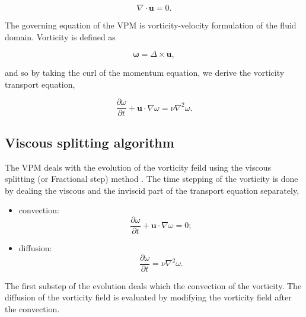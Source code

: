 \begin{equation}
\nabla\cdot\mathbf{u} = 0.
\end{equation}

The governing equation of the VPM is vorticity-velocity formulation of the fluid domain. Vorticity   is defined as

\begin{equation}
\mathbf{\omega} = \Delta \times \mathbf{u},
\end{equation}

and so by taking the curl of the momentum equation, we derive the vorticity transport equation, 

\begin{equation}
\frac{\partial \omega}{\partial t} + \mathbf{u}\cdot\nabla\omega = \nu \nabla^2 \omega.
\end{equation}

\subsection{Viscous splitting algorithm}

The VPM deals with the evolution of the vorticity feild using the viscous splitting (or Fractional step) method \cite{Cottet2000a}. The time stepping of the vorticity is done by dealing the viscous and the inviscid part of the transport equation separately,


\begin{itemize}
\item convection:
\begin{equation}
\frac{\partial\omega}{\partial t} + \mathbf{u}\cdot\nabla\omega=0;
\label{eq:convectionEulerian}
\end{equation}
\item diffusion:
\begin{equation}
\frac{\partial\omega}{\partial t} = \nu\nabla^2\omega.
\end{equation}

\end{itemize}

The first substep of the evolution deals which the convection of the vorticity. The diffusion of the vorticity field is evaluated by modifying the vorticity field after the convection. 

